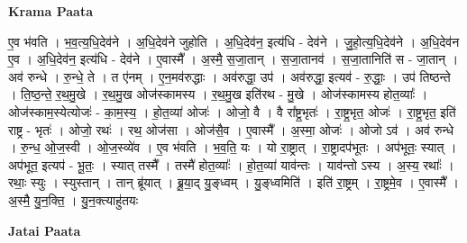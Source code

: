 \documentclass[17pt]{extarticle}
\begin{document}
\textbf{Krama Paata} \newline

ए॒व भ॑वति । भ॒व॒त्य॒धि॒देव॑ने । अ॒धि॒देव॑ने जुहोति । अ॒धि॒देव॑न॒ इत्य॑धि - देव॑ने । जु॒हो॒त्य॒धि॒देव॑ने । अ॒धि॒देव॑न ए॒व । अ॒धि॒देव॑न॒ इत्य॑धि - देव॑ने । ए॒वास्मै᳚ । अ॒स्मै॒ स॒जा॒तान् । स॒जा॒तानव॑ । स॒जा॒तानिति॑ स - जा॒तान् । अव॑ रुन्धे । रु॒न्धे॒ ते । त ए॑नम् । ए॒न॒मव॑रुद्धाः । अव॑रुद्धा॒ उप॑ । अव॑रुद्धा॒ इत्यव॑ - रु॒द्धाः॒ । उप॑ तिष्ठन्ते । ति॒ष्ठ॒न्ते॒ र॒थ॒मु॒खे । र॒थ॒मु॒ख ओज॑स्कामस्य । र॒थ॒मु॒ख इति॑रथ - मु॒खे । ओज॑स्कामस्य होत॒व्याः᳚ । ओज॑स्काम॒स्येत्योजः॑ - का॒म॒स्य॒ । हो॒त॒व्या॑ ओजः॑ । ओजो॒ वै । वै रा᳚ष्ट्र॒भृतः॑ । रा॒ष्ट्र॒भृत॒ ओजः॑ । रा॒ष्ट्र॒भृत॒ इति॑ राष्ट्र - भृतः॑ । ओजो॒ रथः॑ । रथ॒ ओज॑सा । ओज॑सै॒व । ए॒वास्मै᳚ । अ॒स्मा॒ ओजः॑ । ओजो ऽव॑ । अव॑ रुन्धे । रु॒न्ध॒ ओ॒ज॒स्वी । ओ॒ज॒स्व्ये॑व । ए॒व भ॑वति । भ॒व॒ति॒ यः । यो रा॒ष्ट्रात् । रा॒ष्ट्रादप॑भूतः । अप॑भूतः॒ स्यात् । अप॑भूत॒ इत्यप॑ - भू॒तः॒ । स्यात् तस्मै᳚ । तस्मै॑ होत॒व्याः᳚ । हो॒त॒व्या॑ याव॑न्तः । याव॑न्तो ऽस्य । अ॒स्य॒ रथाः᳚ । रथाः॒ स्युः । स्युस्तान् । तान् ब्रू॑यात् । ब्रू॒या॒द् यु॒ङ्ध्वम् । यु॒ङ्ध्वमिति॑ । इति॑ रा॒ष्ट्रम् । रा॒ष्ट्रमे॒व । ए॒वास्मै᳚ । अ॒स्मै॒ यु॒न॒क्ति॒ । यु॒न॒क्त्याहु॑तयः \newline

\textbf{Jatai Paata} \newline
\end{document}
